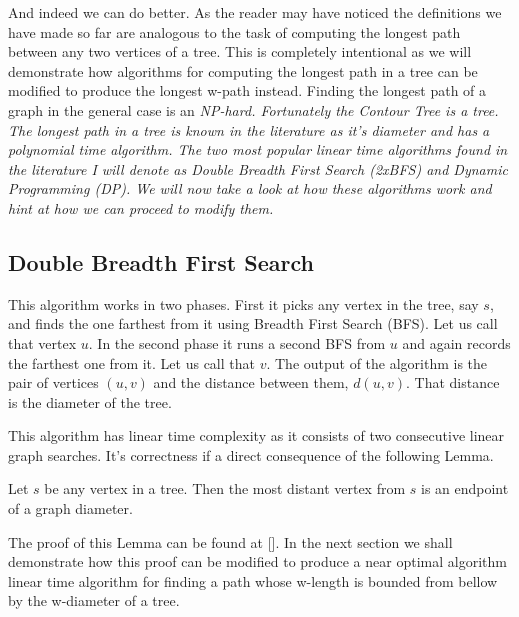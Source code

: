 And indeed we can do better. As the reader may have noticed the definitions we have made so far are analogous to the task of computing the longest path between any two vertices of a tree. This is completely intentional as we will demonstrate how algorithms for computing the longest path in a tree can be modified to produce the longest w-path instead. Finding the longest path of a graph in the general case is an \em NP-hard\em. Fortunately the Contour Tree is a tree. The longest path in a tree is known in the literature as it's diameter and has a polynomial time algorithm. The two most popular linear time algorithms found in the literature I will denote as Double Breadth First Search (2xBFS) and Dynamic Programming (DP). We will now take a look at how these algorithms work and hint at how we can proceed to modify them.


\subsection{Double Breadth First Search}

This algorithm works in two phases. First it picks any vertex in the tree, say $s$, and finds the one farthest from it using Breadth First Search (BFS). Let us call that vertex $u$. In the second phase it runs a second BFS from $u$ and again records the farthest one from it. Let us call that $v$. The output of the algorithm is the pair of vertices $(u, v)$ and the distance between them, $d(u, v)$. That distance is the diameter of the tree.

This algorithm has linear time complexity as it consists of two consecutive linear graph searches. It's correctness if a direct consequence of the following Lemma.

\begin{lem} Let $s$ be any vertex in a tree. Then the most distant vertex from $s$ is an endpoint of a graph diameter. \end{lem}


The proof of this Lemma can be found at []. In the next section we shall demonstrate how this proof can be modified to produce a near optimal algorithm linear time algorithm for finding a path whose w-length is bounded from bellow by the w-diameter of a tree.


